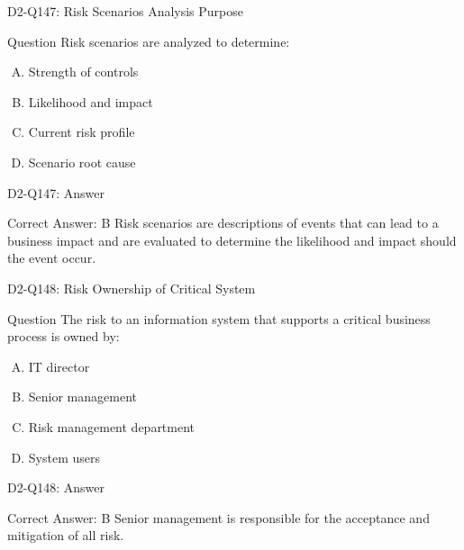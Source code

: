\documentclass{beamer}
\begin{document}
	\begin{frame}{D2-Q147: Risk Scenarios Analysis Purpose}
		\begin{block}{Question}
			Risk scenarios are analyzed to determine:
		\end{block}
		\begin{enumerate}[(A)]
			\item Strength of controls
			\item Likelihood and impact
			\item Current risk profile
			\item Scenario root cause
		\end{enumerate}
	\end{frame}
	\begin{frame}{D2-Q147: Answer}
		\begin{block}{Correct Answer: B}
			Risk scenarios are descriptions of events that can lead to a business impact and are evaluated to determine the likelihood and impact should the event occur.
		\end{block}
	\end{frame}
	
	\begin{frame}{D2-Q148: Risk Ownership of Critical System}
		\begin{block}{Question}
			The risk to an information system that supports a critical business process is owned by:
		\end{block}
		\begin{enumerate}[(A)]
			\item IT director
			\item Senior management
			\item Risk management department
			\item System users
		\end{enumerate}
	\end{frame}
	\begin{frame}{D2-Q148: Answer}
		\begin{block}{Correct Answer: B}
			Senior management is responsible for the acceptance and mitigation of all risk.
		\end{block}
	\end{frame}
	
\end{document}
